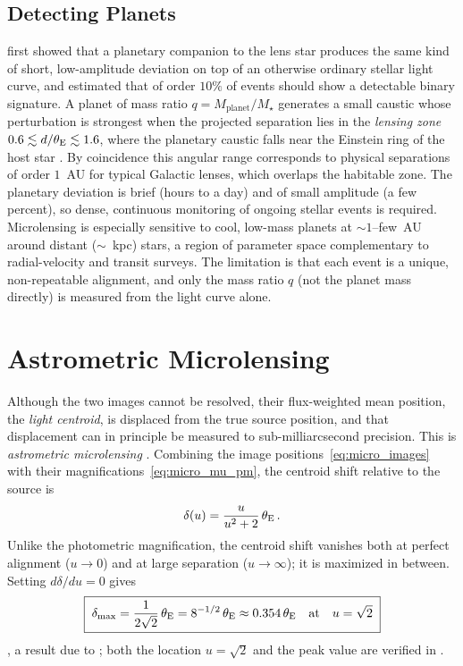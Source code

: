 \subsection{Detecting Planets}

\citet{mao_paczynski_1991} first showed that a planetary companion to the lens
star produces the same kind of short, low-amplitude deviation on top of an
otherwise ordinary stellar light curve, and estimated that of order $10\%$ of
events should show a detectable binary signature.  A planet of mass ratio
$q = M_{\mathrm{planet}}/M_\star$ generates a small caustic whose perturbation
is strongest when the projected separation lies in the \emph{lensing zone}
$0.6 \lesssim d/\theta_{\mathrm{E}} \lesssim 1.6$, where the planetary caustic falls near
the Einstein ring of the host star
\citep[Sect.~4.1]{schneider_kochanek_wambsganss_2006}.  By
coincidence this angular range corresponds to physical separations of order
$1$~AU for typical Galactic lenses, which overlaps the habitable zone.  The
planetary deviation is brief (hours to a day) and of small amplitude (a few
percent), so dense, continuous monitoring of ongoing stellar events is
required.  Microlensing is especially sensitive to cool, low-mass
planets at $\sim\!1$--few~AU around distant ($\sim$~kpc) stars, a region of
parameter space complementary to radial-velocity and transit surveys.  The
limitation is that each event is a unique, non-repeatable alignment, and
only the mass ratio $q$ (not the planet mass directly) is measured from the
light curve alone.


\section{Astrometric Microlensing}
\label{sec:astrometric}

Although the two images cannot be resolved, their flux-weighted mean
position, the \emph{light centroid}, is displaced from the true source
position, and that displacement can in principle be measured to
sub-milliarcsecond precision.  This is \emph{astrometric microlensing}
\citep[Sect.~6]{schneider_kochanek_wambsganss_2006}.  Combining the image
positions~\eqref{eq:micro_images} with their
magnifications~\eqref{eq:micro_mu_pm}, the centroid shift relative to the
source is
\begin{equation}
    \delta(u) = \frac{u}{u^2 + 2}\,\theta_{\mathrm{E}} \,.
    \label{eq:micro_centroid}
\end{equation}
Unlike the photometric magnification, the centroid shift vanishes both
at perfect alignment ($u\to0$) and at large separation ($u\to\infty$); it is
maximized in between.  Setting $d\delta/du = 0$ gives
\begin{equation}
    \boxed{\;\delta_{\max} = \frac{1}{2\sqrt{2}}\,\theta_{\mathrm{E}}
    = 8^{-1/2}\,\theta_{\mathrm{E}} \approx 0.354\,\theta_{\mathrm{E}}
    \quad\text{at}\quad u = \sqrt{2}\;}
    \label{eq:micro_centroid_max}
\end{equation}
\citep[eq.~22]{schneider_kochanek_wambsganss_2006}, a result due to
\citet{paczynski_1998}; both the location $u = \sqrt{2}$ and the peak value are
verified in .

